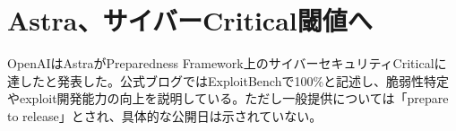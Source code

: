 \section{Astra、サイバーCritical閾値へ}
OpenAIはAstraがPreparedness Framework上のサイバーセキュリティCriticalに達したと発表した。公式ブログではExploitBenchで100\%と記述し、脆弱性特定やexploit開発能力の向上を説明している。ただし一般提供については「prepare to release」とされ、具体的な公開日は示されていない。
